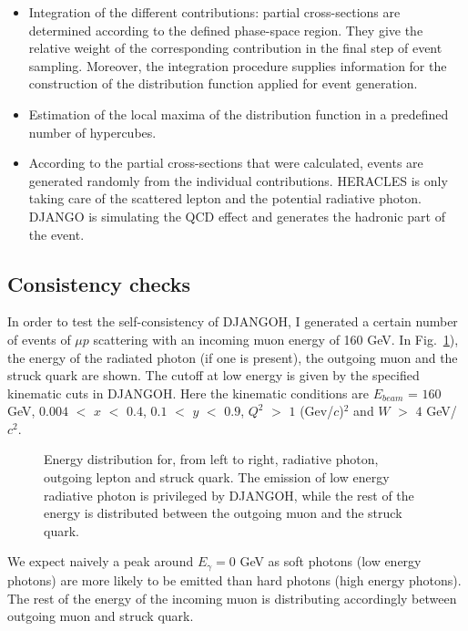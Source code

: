 \begin{itemize}
\item Integration of the different contributions: partial cross-sections are determined according to the defined phase-space region. They give the relative weight of the corresponding contribution in the final step of event sampling. Moreover, the integration procedure supplies information for the construction of the distribution function applied for event generation.
\item Estimation of the local maxima of the distribution function in a predefined number of hypercubes.
\item According to the partial cross-sections that were calculated, events are generated randomly from the individual contributions. HERACLES is only taking care of the scattered lepton and the potential radiative photon. DJANGO is simulating the QCD effect and generates the hadronic part of the event.
\end{itemize}

\subsection{Consistency checks}

In order to test the self-consistency of DJANGOH, I generated a certain number of events of $\mu p$ scattering with an incoming muon energy of 160 GeV. In Fig.~\ref{fig:edist}), the energy of the radiated photon (if one is present), the outgoing muon and the struck quark are shown. The cutoff at low energy is given by the specified kinematic cuts in DJANGOH. Here the kinematic conditions are $E_{beam}$ = $160$ GeV, $0.004$ $<$ $x$ $<$ $0.4$, $0.1$ $<$ $y$ $<$ $0.9$, $Q^2$ $>$ $1$ (Gev/$c$)$^2$ and $W$ $>$ $4$ GeV/$c^2$.

\begin{figure}[htb]
\centerline{}
\caption{Energy distribution for, from left to right, radiative photon, outgoing lepton and struck quark. The emission of low energy radiative photon is privileged by DJANGOH, while the rest of the energy is distributed between the outgoing muon and the struck quark.} \label{fig:edist}
\end{figure}

We expect naively a peak around $E_{\gamma} = 0$ GeV as soft photons (low energy photons) are more likely to be emitted than hard photons (high energy photons). The rest of the energy of the incoming muon is distributing accordingly between outgoing muon and struck quark.

